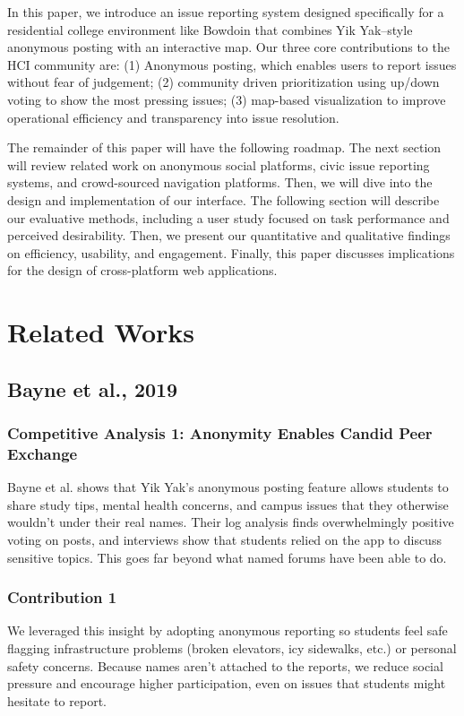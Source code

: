 \documentclass{article}
\begin{document}
In this paper, we introduce an issue reporting system designed specifically for a residential college environment like Bowdoin that combines Yik Yak–style anonymous posting with an interactive map. Our three core contributions to the HCI community are: (1) Anonymous posting, which enables users to report issues without fear of judgement; (2) community driven prioritization using up/down voting to show the most pressing issues; (3) map-based visualization to improve operational efficiency and transparency into issue resolution. 


The remainder of this paper will have the following roadmap. The next section will review related work on anonymous social platforms, civic issue reporting systems, and crowd-sourced navigation platforms. Then, we will dive into the design and implementation of our interface. The following section will describe our evaluative methods, including a user study focused on task performance and perceived desirability. Then, we present our quantitative and qualitative findings on efficiency, usability, and engagement. Finally, this paper discusses implications for the design of cross-platform web applications. 


\newpage

\section{Related Works}

\subsection{Bayne et al., 2019\cite{bayne_social_2019}}



\subsubsection*{Competitive Analysis 1: Anonymity Enables Candid Peer Exchange}
Bayne et al. shows that Yik Yak’s anonymous posting feature allows students to share study tips, mental health concerns, and campus issues that they otherwise wouldn’t under their real names. Their log analysis finds overwhelmingly positive voting on posts, and interviews show that students relied on the app to discuss sensitive topics. This goes far beyond what named forums have been able to do. 


\subsubsection*{Contribution 1}
We leveraged this insight by adopting anonymous reporting so students feel safe flagging infrastructure problems (broken elevators, icy sidewalks, etc.) or personal safety concerns. Because names aren’t attached to the reports, we reduce social pressure and encourage higher participation, even on issues that students might hesitate to report. 
\end{document}
